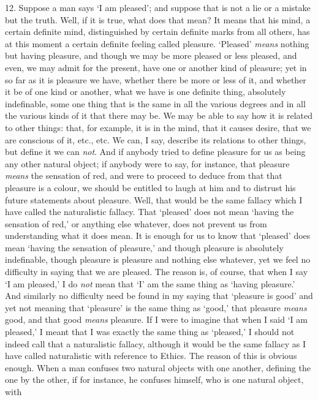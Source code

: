 12. Suppose a man says `I am pleased'; and suppose that is not a lie
or a mistake but the truth. Well, if it is true, what does that mean?
It means that his mind, a certain definite mind, distinguished by
certain definite marks from all others, has at this moment a certain
definite feeling called pleasure. `Pleased' \textit{means} nothing but
having pleasure, and though we may be more pleased or less pleased,
and even, we may admit for the present, have one or another kind of
pleasure; yet in so far as it is pleasure we have, whether there be
more or less of it, and whether it be of one kind or another, what we
have is  one definite thing, absolutely indefinable, some one
thing that is the same in all the various degrees and in all the
various kinds of it that there may be. We may be able to say how it is
related to other things: that, for example, it is in the mind, that it
causes desire, that we are conscious of it, etc., etc. We can, I say,
describe its relations to other things, but define it we can
\textit{not}. And if anybody tried to define pleasure for us as being
any other natural object; if anybody were to say, for instance, that
pleasure \textit{means} the sensation of red, and were to proceed to
deduce from that that pleasure is a colour, we should be entitled to
laugh at him and to distrust his future statements about pleasure.
Well, that would be the same fallacy which I have called the
naturalistic fallacy. That `pleased' does not mean `having the
sensation of red,' or anything else whatever, does not prevent us from
understanding what it does mean. It is enough for us to know that
`pleased' does mean `having the sensation of pleasure,' and though
pleasure is absolutely indefinable, though pleasure is pleasure and
nothing else whatever, yet we feel no difficulty in saying that we are
pleased. The reason is, of course, that when I say `I am pleased,' I
do \textit{not} mean that `I' am the same thing as `having pleasure.'
And similarly no difficulty need be found in my saying that `pleasure
is good' and yet not meaning that `pleasure' is the same thing as
`good,' that pleasure \textit{means} good, and that good
\textit{means} pleasure. If I were to imagine that when I said `I am
pleased,' I meant that I was exactly the same thing as `pleased,' I
should not indeed call that a naturalistic fallacy, although it would
be the same fallacy as I have called naturalistic with reference to
Ethics. The reason of this is obvious enough. When a man confuses
two natural objects with one another, defining the one by the other,
if for instance, he confuses himself, who is one natural object, with
